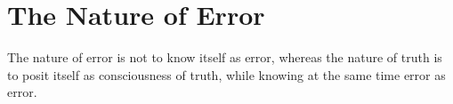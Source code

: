 \section{The Nature of Error}

\begin{quotex}
The nature of error is not to know itself as error, whereas the nature of truth is to posit itself as consciousness of truth, while knowing at the same time error as error.
\end{quotex}


